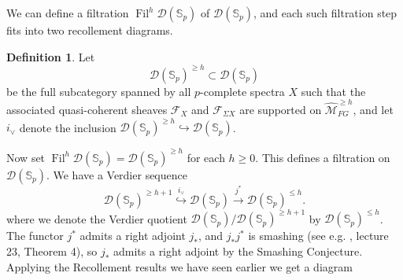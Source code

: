 \documentclass[a4paper]{article} %
\theoremstyle{definition}
\newtheorem{definition}[theorem]{Definition}
\newcommand{\moduliH}{\widehat{\mathcal{M}}_{FG}}
\newcommand{\Spp}{\mathcal{D}(\mathbb{S}_p)}
\begin{document}
We can define a filtration $\operatorname{Fil}^h \Spp$ of $\Spp$, and each such filtration step fits into two recollement diagrams.
\begin{definition}
  Let
  \[
  \Spp^{\ge h} \subset \Spp
  \]
  be the full subcategory spanned by all $p$-complete spectra $X$ such that the associated quasi-coherent sheaves $\mathcal{F}_X$ and $\mathcal{F}_{\Sigma X}$ are supported on $\moduliH^{\ge h}$, and let $i_\vee$ denote the inclusion $\Spp^{\ge h} \hookrightarrow \Spp$.
\end{definition}
Now set $\operatorname{Fil}^h \Spp = \Spp^{\ge h}$ for each $h \ge 0$. This defines a filtration on $\Spp$. We have a Verdier sequence
\[
\Spp^{\ge h+1} \overset{i_\vee}{\hookrightarrow} \Spp \overset{j^*}{\to} \Spp^{\le h}.
\]
where we denote the Verdier quotient $\Spp/\Spp^{\ge h+1}$ by $\Spp^{\le h}$. The functor $j^*$ admits a right adjoint $j_*$, and $j_*j^*$ is smashing (see e.g. \cite{luriechromatichomotopytheorynotes}, lecture 23, Theorem 4), so $j_*$ admits a right adjoint by the Smashing Conjecture. Applying the Recollement results we have seen earlier we get a diagram
\iffalse
\begin{center}
  \begin{tikzcd}
    X \arrow[dr, shift left=1ex, "i_\vee"] & & \\
    & X \arrow{r} \arrow[ul, shift right=1ex, "i_\vee"] & X \\
    X \arrow{ur} & &
  \end{tikzcd}
\end{center}
\fi
\end{document}
